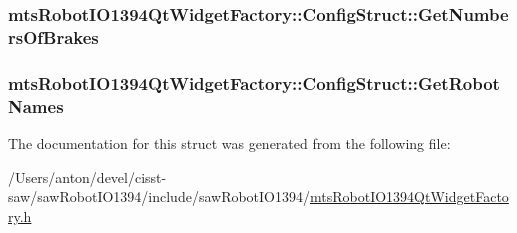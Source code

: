 \subsubsection[{Get\+Numbers\+Of\+Brakes}]{ mts\+Robot\+I\+O1394\+Qt\+Widget\+Factory\+::\+Config\+Struct\+::\+Get\+Numbers\+Of\+Brakes}\label{structmts_robot_i_o1394_qt_widget_factory_1_1_config_struct_af94d75bc59d42e56fc3111524dfa2352}
\hypertarget{structmts_robot_i_o1394_qt_widget_factory_1_1_config_struct_a23dacd0bac2b78c3189369f05574f678}{}
\subsubsection[{Get\+Robot\+Names}]{ mts\+Robot\+I\+O1394\+Qt\+Widget\+Factory\+::\+Config\+Struct\+::\+Get\+Robot\+Names}\label{structmts_robot_i_o1394_qt_widget_factory_1_1_config_struct_a23dacd0bac2b78c3189369f05574f678}


The documentation for this struct was generated from the following file\+:\begin{DoxyCompactItemize}
\item 
/\+Users/anton/devel/cisst-\/saw/saw\+Robot\+I\+O1394/include/saw\+Robot\+I\+O1394/\hyperlink{mts_robot_i_o1394_qt_widget_factory_8h}{mts\+Robot\+I\+O1394\+Qt\+Widget\+Factory.\+h}\end{DoxyCompactItemize}

